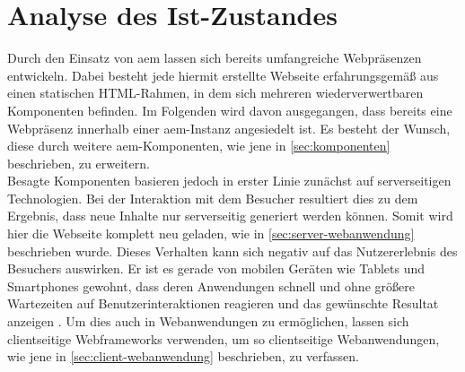 \chapter{Analyse des Ist-Zustandes}
\label{sec:ist-zustand}

Durch den Einsatz von \ac{aem} lassen sich bereits umfangreiche Webpräsenzen entwickeln. Dabei besteht jede hiermit erstellte Webseite erfahrungsgemäß aus einen statischen HTML-Rahmen, in dem sich mehreren wiederverwertbaren Komponenten befinden. Im Folgenden wird davon ausgegangen, dass bereits eine Webpräsenz innerhalb einer \ac{aem}-Instanz angesiedelt ist. Es besteht der Wunsch, diese durch weitere \ac{aem}-Komponenten, wie jene in \autoref{sec:komponenten} beschrieben, zu erweitern.\\
Besagte Komponenten basieren jedoch in erster Linie zunächst auf serverseitigen Technologien. Bei der Interaktion mit dem Besucher resultiert dies zu dem Ergebnis, dass neue Inhalte nur serverseitig generiert werden können. Somit wird hier die Webseite komplett neu geladen, wie in \autoref{sec:server-webanwendung} beschrieben wurde. Dieses Verhalten kann sich negativ auf das Nutzererlebnis des Besuchers auswirken. Er ist es gerade von mobilen Geräten wie Tablets und Smartphones gewohnt, dass deren Anwendungen schnell und ohne größere Wartezeiten auf Benutzerinteraktionen reagieren und das gewünschte Resultat anzeigen \cite[S. 78]{Rizvanoglu2013}. Um dies auch in Webanwendungen zu ermöglichen, lassen sich clientseitige Webframeworks verwenden, um so clientseitige Webanwendungen, wie jene in \autoref{sec:client-webanwendung} beschrieben, zu verfassen.\\





